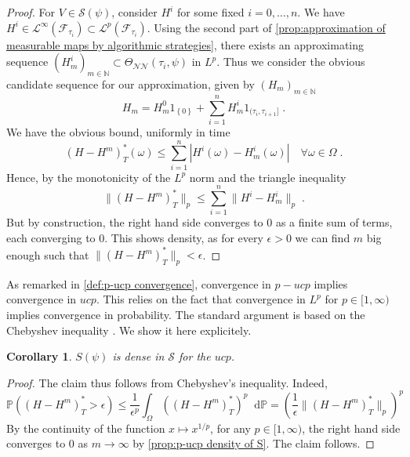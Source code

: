 \documentclass[11pt]{report}
\newcommand{\diff}{\mathop{}\!\mathrm{d}}
\theoremstyle{plain} %
\newtheorem{corollary}[corollary]{Corollary}
\theoremstyle{definition} %
\theoremstyle{remark} %
\begin{document}
\begin{proof}
For \(V\in\mathcal{S}(\psi)\), consider \(H^i\) for some fixed \(i=0,\dots,n\). We have \(H^i\in\mathcal{L}^{\infty}(\mathcal{F}_{\tau_i})\subset \mathcal{L}^p(\mathcal{F}_{\tau_i})\). Using the second part of \cref{prop:approximation of measurable maps by algorithmic strategies}, there exists an approximating sequence \((H^i_m)_{m\in\mathbb{N}}\subset\Theta_{\mathcal{NN}}(\tau_i,\psi)\) in \(L^p\). Thus we consider the obvious candidate sequence for our approximation, given by \((H_m)_{m\in\mathbb{N}}\)
\begin{equation}
    H_m = H^0_m1_{\left\{0\right\}}+\sum_{i=1}^nH^i_m1_{(\tau_i,\tau_{i+1}]}\;.
\end{equation}
We have the obvious bound, uniformly in time
\begin{equation}
   (H-H^m)_{T}^*(\omega)\leq \sum_{i=1}^n|H^i(\omega)-H^i_m(\omega)|\quad\forall\omega\in\Omega\;.
\end{equation}
Hence, by the monotonicity of the \(L^p\) norm and the triangle inequality
\begin{equation}
    \lVert (H-H^m)_{T}^*\rVert_{p}\leq\sum_{i=1}^n\lVert H^i-H^i_m\rVert_p\;.
\end{equation}
But by construction, the right hand side converges to \(0\) as a finite sum of terms, each converging to \(0\). This shows density, as for every \(\epsilon>0\) we can find \(m\) big enough such that \(\lVert (H-H^m)_{T}^*\rVert_{p}<\epsilon\). 
\end{proof}
As remarked in \cref{def:p-ucp convergence}, convergence in \(p-ucp\) implies convergence in \(ucp\). This relies on the fact that convergence in \(L^p\) for \(p\in[1,\infty)\) implies convergence in probability. The standard argument is based on the Chebyshev inequality \parencite[Sec.8.2.1.]{LeGall2022MeasureTheoryProbabilityStochasticProcesses}. We show it here explicitely. 
\begin{corollary}\label{cor:p-ucp density of S}
    \(S(\psi)\) is dense in \(\mathcal{S}\) for the \(ucp\).
\end{corollary}
\begin{proof}
   The claim thus follows from Chebyshev's inequality. Indeed,
    \begin{equation}
        \mathbb{P}((H-H^m)_{T}^*>\epsilon)\leq\frac{1}{\epsilon^p}\int_{\Omega}\left((H-H^m)_{T}^*\right)^p\diff \mathbb{P}=\left(\frac{1}{\epsilon}\lVert (H-H^m)_{T}^*\rVert_p\right)^p
    \end{equation}
By the continuity of the function \(x\mapsto x^{1/p}\), for any \(p\in[1,\infty)\), the right hand side converges to \(0\) as \(m\to\infty\) by \cref{prop:p-ucp density of S}. The claim follows. 
\end{proof}
\end{document}
